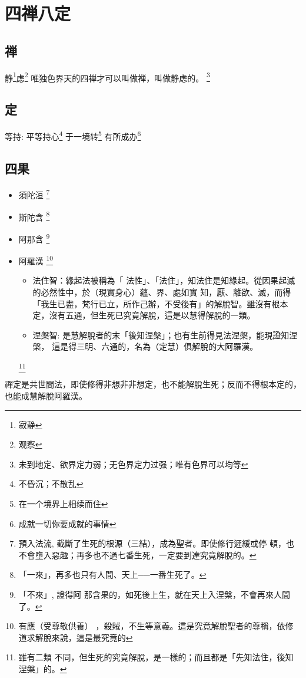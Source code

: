 \section{四禅八定}

\subsection{禅}
静\footnote{寂静}虑\footnote{观察}
唯独色界天的四禅才可以叫做禅，叫做静虑的。
\footnote{未到地定、欲界定力弱；无色界定力过强；唯有色界可以均等}
\subsection{定}
等持:
平等持心\footnote{不昏沉；不散乱}
于一境转\footnote{在一个境界上相续而住}
有所成办\footnote{成就一切你要成就的事情}



\subsection{四果}
\begin{itemize}
  \item 須陀洹
    \footnote{預入法流, 截斷了生死的根源（三結），成為聖者。即使修行遲緩或停 頓，也不會墮入惡趣；再多也不過七番生死，一定要到達究竟解脫的。}
  \item 斯陀含
    \footnote{「一來」，再多也只有人間、天上──一番生死了。}
  \item 阿那含
    \footnote{「不來」, 證得阿 那含果的，如死後上生，就在天上入涅槃，不會再來人間了。}
  \item 阿羅漢
    \footnote{有應（受尊敬供養） ，殺賊，不生等意義。這是究竟解脫聖者的尊稱，依修道求解脫來說，這是最究竟的}
    \begin{itemize}
      \item 法住智：緣起法被稱為「 法性」、「法住」，知法住是知緣起。從因果起滅的必然性中，於（現實身心）蘊、界、處如實 知，厭、離欲、滅，而得「我生已盡，梵行已立，所作己辦，不受後有」的解脫智。雖沒有根本 定，沒有五通，但生死已究竟解脫，這是以慧得解脫的一類。
      \item 涅槃智:  是慧解脫者的末「後知涅槃」；也有生前得見法涅槃，能現證知涅槃， 這是得三明、六通的，名為（定慧）俱解脫的大阿羅漢。
    \end{itemize}
    \footnote{雖有二類 不同，但生死的究竟解脫，是一樣的；而且都是「先知法住，後知涅槃」的。}
\end{itemize}
禪定是共世間法，即使修得非想非非想定，也不能解脫生死；反而不得根本定的，也能成慧解脫阿羅漢。


